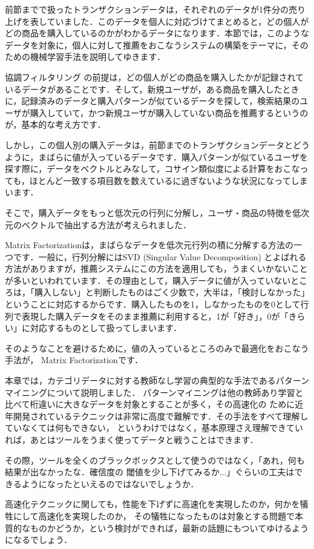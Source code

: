 

前節までで扱ったトランザクションデータは，それぞれのデータが1件分の売り上げを表していました．このデータを個人に対応づけてまとめると，どの個人がどの商品を購入しているのかがわかるデータになります．本節では，このようなデータを対象に，個人に対して推薦をおこなうシステムの構築をテーマに，そのための機械学習手法を説明してゆきます．


協調フィルタリング
の前提は，どの個人がどの商品を購入したかが記録されているデータがあることです．そして，新規ユーザが，ある商品を購入したときに，記録済みのデータと購入パターンが似ているデータを探して，検索結果のユーザが購入していて，かつ新規ユーザが購入していない商品を推薦するというのが，基本的な考え方です．

しかし，この個人別の購入データは，前節までのトランザクションデータとどうように，まばらに値が入っているデータです．購入パターンが似ているユーザを探す際に，データをベクトルとみなして，コサイン類似度による計算をおこなっても，ほとんど一致する項目数を数えているに過ぎないような状況になってしまいます．


そこで，購入データをもっと低次元の行列に分解し，ユーザ・商品の特徴を低次元のベクトルで抽出する方法が考えられました．


Matrix Factorizationは，まばらなデータを低次元行列の積に分解する方法の一つです．一般に，行列分解にはSVD (Singular Value Decomposition) とよばれる方法がありますが，推薦システムにこの方法を適用しても，うまくいかないことが多いといわれています．その理由として，購入データに値が入っていないところは，「購入しない」と判断したものはごく少数で，大半は，「検討しなかった」ということに対応するからです．購入したものを1，しなかったものを0として行列で表現した購入データをそのまま推薦に利用すると，1が「好き」，0が「きらい」に対応するものとして扱ってしまいます．

そのようなことを避けるために，値の入っているところのみで最適化をおこなう手法が，
Matrix Factorizationです．


本章では，カテゴリデータに対する教師なし学習の典型的な手法であるパターンマイニングについて説明しました．
パターンマイニングは他の教師あり学習と比べて桁違いに大きなデータを対象とすることが多く，その高速化の
ために近年開発されているテクニックは非常に高度で難解です．その手法をすべて理解していなくては何もできない，
というわけではなく，基本原理さえ理解できていれば，あとはツールをうまく使ってデータと戦うことはできます．

その際，ツールを全くのブラックボックスとして使うのではなく，「あれ，何も結果が出なかったな．確信度の
閾値を少し下げてみるか...」ぐらいの工夫はできるようになったといえるのではないでしょうか．

高速化テクニックに関しても，性能を下げずに高速化を実現したのか，何かを犠牲にして高速化を実現したのか，
その犠牲になったものは対象とする問題で本質的なものかどうか，という検討ができれば，最新の話題にもついてゆけるようになるでしょう．
